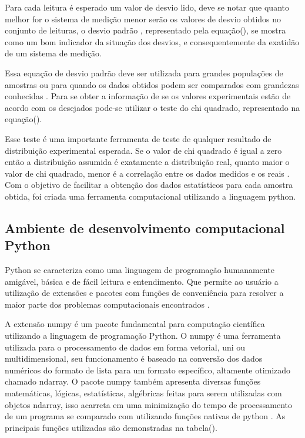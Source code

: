 Para cada leitura é esperado um valor de desvio lido, deve se notar que quanto melhor for o sistema de medição menor serão os valores de desvio obtidos no conjunto de leituras, o desvio padrão , representado pela equação(), se mostra como um bom indicador da situação dos desvios, e consequentemente da exatidão de um sistema de medição.

Essa equação de desvio padrão deve ser utilizada para grandes populações de amostras ou para quando os dados obtidos podem ser comparados com grandezas conhecidas \autocite{Hollman2011}. Para se obter a informação de se os valores experimentais estão de acordo com os desejados pode-se utilizar o teste do chi quadrado, representado na equação().

Esse teste é uma importante ferramenta de teste de qualquer resultado de distribuição experimental esperada. Se o valor de chi quadrado é igual a zero então a distribuição assumida é exatamente a distribuição real, quanto maior o valor de chi quadrado, menor é a correlação entre os dados medidos e os reais \autocite{Hollman2011}. Com o objetivo de facilitar a obtenção dos dados estatísticos para cada amostra obtida, foi criada uma ferramenta computacional utilizando a linguagem python.

\subsection{Ambiente de desenvolvimento computacional Python}

Python se caracteriza como uma linguagem de programação humanamente amigável, básica e de fácil leitura e entendimento. Que permite ao usuário a utilização de extensões e pacotes com funções de conveniência para resolver a maior parte dos problemas computacionais encontrados \autocite{TimHall2010}.

A extensão numpy é um pacote fundamental para computação científica utilizando a linguagem de programação Python. O numpy é uma ferramenta utilizada para o processamento de dados em forma vetorial, uni ou multidimensional, seu funcionamento é baseado na conversão dos dados numéricos do formato de lista para um formato específico, altamente otimizado chamado ndarray. O pacote numpy também apresenta diversas funções matemáticas, lógicas, estatísticas, algébricas feitas para serem utilizadas com objetos ndarray, isso acarreta em uma minimização do tempo de processamento de um programa se comparado com utilizando funções nativas de python \autocite{DocsPandas}. As principais funções utilizadas são demonstradas na tabela().

